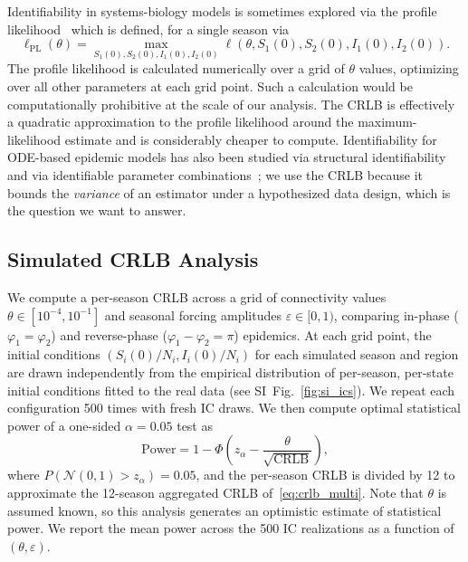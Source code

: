 \documentclass[9pt,twocolumn,twoside]{pnas-new}
\begin{document}
{Identifiability in systems-biology models is sometimes explored via
the profile likelihood~\citep{raue2009, shrestha2011} which is defined,
for a single season via
%
%
$$
\ell_{\text{PL}}(\theta) = \max_{S_1(0), S_2(0), I_1(0), I_2(0)} \ell(\theta, S_1(0), S_2(0), I_1(0), I_2(0)).
$$
%
%
The profile likelihood is calculated numerically over a grid of
$\theta$ values, optimizing over all other parameters at each grid
point. Such a calculation would be computationally prohibitive at the
scale of our analysis. The CRLB is effectively a quadratic
approximation to the profile likelihood around the maximum-likelihood
estimate and is considerably cheaper to compute. Identifiability for
ODE-based epidemic models has also been studied via structural
identifiability~\citep{tuncer2018, chowell2023structural} and via
identifiable parameter combinations~\citep{eisenberg2014}; we use the
CRLB because it bounds the \emph{variance} of an estimator under a
hypothesized data design, which is the question we want to answer.

\subsection*{Simulated CRLB Analysis}\label{subsec:sim_crlb}
We compute a per-season CRLB across a grid of connectivity values
$\theta \in [10^{-4}, 10^{-1}]$ and seasonal forcing amplitudes
$\varepsilon \in [0, 1)$, comparing in-phase ($\varphi_1 = \varphi_2$)
  and reverse-phase ($\varphi_1 - \varphi_2 = \pi$) epidemics. At each
  grid point, the initial conditions $(S_i(0)/N_i, I_i(0)/N_i)$ for
  each simulated season and region are drawn independently from the
  empirical distribution of per-season, per-state initial conditions
  fitted to the real data (see SI~Fig.~\ref{fig:si_ics}). We repeat
  each configuration 500 times with fresh IC draws. We then compute
  optimal statistical power of a one-sided $\alpha = 0.05$ test as
\begin{equation}\label{eq:power}
\text{Power} = 1 - \Phi\!\left(z_\alpha -
\frac{\theta}{\sqrt{\text{CRLB}}}\right),
\end{equation}
where $P\left(\mathcal{N}(0,1) > z_\alpha\right) = 0.05$, and the
per-season CRLB is divided by 12 to approximate the 12-season
aggregated CRLB of~\eqref{eq:crlb_multi}. Note that $\theta$ is
assumed known, so this analysis generates an optimistic estimate of
statistical power. We report the mean power across the 500 IC
realizations as a function of $(\theta, \varepsilon)$.

}
\end{document}
